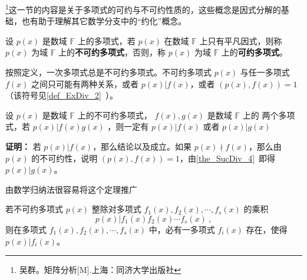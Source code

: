 

\footnote{吴群。矩阵分析[M].上海：同济大学出版社}这一节的内容是关于多项式的可约与不可约性质的，这些概念是因式分解的基础，也有助于理解其它数学分支中的“约化”概念。

\begin{definition}{}\label{def_RedPol_1}
设 $p(x)$ 是数域 $\mathbb{F}$ 上的多项式，若 $p(x)$ 在数域 $\mathbb{F}$ 上只有平凡因式，则称 $p(x)$ 为域 $\mathbb{F}$ 上的\textbf{不可约多项式}，否则，称 $p(x)$ 为域 $\mathbb{F}$ 上的\textbf{可约多项式}。
\end{definition}
按照定义，一次多项式总是不可约多项式。不可约多项式 $p(x)$ 与任一多项式 $f(x)$ 之间只可能有两种关系，或者 $p(x)|f(x)$，或者 $(p(x),f(x))=1$（该符号见\autoref{def_ExDiv_2}~）。

\begin{theorem}{}
设 $p(x)$ 是数域 $\mathbb{F}$ 上的不可约多项式， $f(x),g(x)$ 是数域 $\mathbb{F}$ 上的 两个多项式，若 $p(x)|f(x)g(x)$ ，则一定有 $p(x)|f(x)$ 或者 $p(x)|g(x)$
\end{theorem}
\textbf{证明：} 若 $p(x)|f(x)$，那么结论以及成立。如果 $p(x)\nmid f(x)$，那么由 $p(x)$ 的不可约性，说明 $(p(x),f(x))=1$，由\autoref{the_SucDiv_4}~即得 $p(x)|g(x)$。

由数学归纳法很容易将这个定理推广
\begin{theorem}{}\label{the_RedPol_1}
若不可约多项式 $p(x)$ 整除对多项式 $f_1(x),f_2(x),\cdots,f_s(x)$ 的乘积
\begin{equation}
p(x)|f_1(x)f_2(x)\cdots f_s(x)~,
\end{equation}
则在多项式 $f_1(x),f_2(x),\cdots,f_s(x)$ 中，必有一多项式 $f_i(x)$ 存在，使得 $p(x)|f_i(x)$。
\end{theorem}
